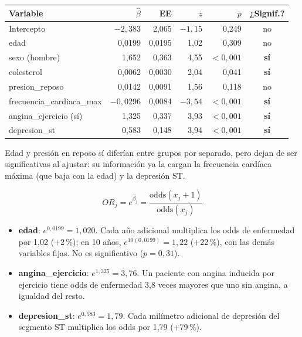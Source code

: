 \begin{center}\small
\begin{tabular}{lrrrrc}
\toprule
Variable & $\hat\beta$ & EE & $z$ & $p$ & ¿Signif.? \\ \midrule
Intercepto & $-2,383$ & 2,065 & $-1,15$ & 0,249 & no \\
edad & 0,0199 & 0,0195 & 1,02 & 0,309 & no \\
sexo (hombre) & 1,652 & 0,363 & 4,55 & $<0,001$ & \textbf{sí} \\
colesterol & 0,0062 & 0,0030 & 2,04 & 0,041 & \textbf{sí} \\
presion\_reposo & 0,0142 & 0,0091 & 1,56 & 0,118 & no \\
frecuencia\_cardiaca\_max & $-0,0296$ & 0,0084 & $-3,54$ & $<0,001$ & \textbf{sí} \\
angina\_ejercicio (sí) & 1,325 & 0,337 & 3,93 & $<0,001$ & \textbf{sí} \\
depresion\_st & 0,583 & 0,148 & 3,94 & $<0,001$ & \textbf{sí} \\ \bottomrule
\end{tabular}
\end{center}
Edad y presión en reposo sí diferían entre grupos por separado, pero dejan de ser significativas al
ajustar: su información ya la cargan la frecuencia cardíaca máxima (que baja con la edad) y la depresión ST.


\[
OR_j=e^{\hat\beta_j}=\frac{\text{odds}(x_j+1)}{\text{odds}(x_j)}
\]
\begin{itemize}[leftmargin=1.2em]
  \item[\color{cTeal}\faUser] \textbf{edad}: $e^{0,0199}=1,020$. Cada año adicional multiplica los odds de
  enfermedad por 1,02 (+2\,\%); en 10 años, $e^{10(0,0199)}=1,22$ (+22\,\%), con las demás variables fijas.
  No es significativo ($p=0,31$).
  \item[\color{cRed}\faHeartbeat] \textbf{angina\_ejercicio}: $e^{1,325}=3,76$. Un paciente con angina
  inducida por ejercicio tiene odds de enfermedad 3,8 veces mayores que uno sin angina, a igualdad del resto.
  \item[\color{cRed}\faChartLine] \textbf{depresion\_st}: $e^{0,583}=1,79$. Cada milímetro adicional de
  depresión del segmento ST multiplica los odds por 1,79 (+79\,\%).
\end{itemize}

